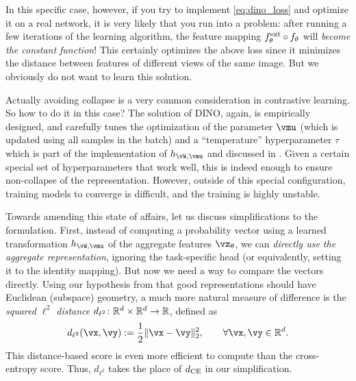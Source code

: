 \documentclass[\toplevelprefix/book-main.tex]{subfiles}
\begin{document}
In this specific case, however, if you try to implement \eqref{eq:dino_loss} and optimize it on a real network, it is very likely that you run into a problem: after running a few iterations of the learning algorithm, the feature mapping \(f_{\theta}^{\mathrm{ext}} \circ f_{\theta}\) will \textit{become the constant function}! This certainly optimizes the above loss since it minimizes the distance between features of different views of the same image. But we obviously do not want to learn this solution. 

Actually avoiding collapse is a very common consideration in contrastive learning. So how to do it in this case? The solution of DINO, again, is empirically designed, and carefully tunes the optimization of the parameter \(\vmu\) (which is updated using all samples in the batch) and a ``temperature'' hyperparameter \(\tau\) which is part of the implementation of \(h_{\vW, \vmu}\) and discussed in . Given a certain special set of hyperparameters that work well, this is indeed enough to ensure non-collapse of the representation. However, outside of this special configuration, training models to converge is difficult, and the training is highly unstable. 

Towards amending this state of affairs, let us discuss simplifications to the formulation. First, instead of computing a probability vector using a learned transformation \(h_{\vW, \vmu}\) of the aggregate features \(\vz_{\theta}\), we can \textit{directly use the aggregate representation}, ignoring the task-specific head (or equivalently, setting it to the identity mapping). But now we need a way to compare the vectors directly. Using our hypothesis from  that good representations should have Euclidean (subspace) geometry, a much more natural measure of difference is the \textit{squared \(\ell^{2}\) distance} \(d_{\ell^{2}} \colon \mathbb{R}^{d} \times \mathbb{R}^{d} \to \mathbb{R}\), defined as 
\begin{equation}\label{eq:cosine_similarity}
    d_{\ell^{2}}(\vx, \vy) := \frac{1}{2}\norm{\vx - \vy}_{2}^{2}, \qquad  \forall \vx, \vy \in \R^{d}.
\end{equation}
This distance-based score is even more efficient to compute than the cross-entropy score. Thus, \(d_{\ell^{2}}\) takes the place of \(d_{\operatorname{CE}}\) in our simplification. 
\end{document}
